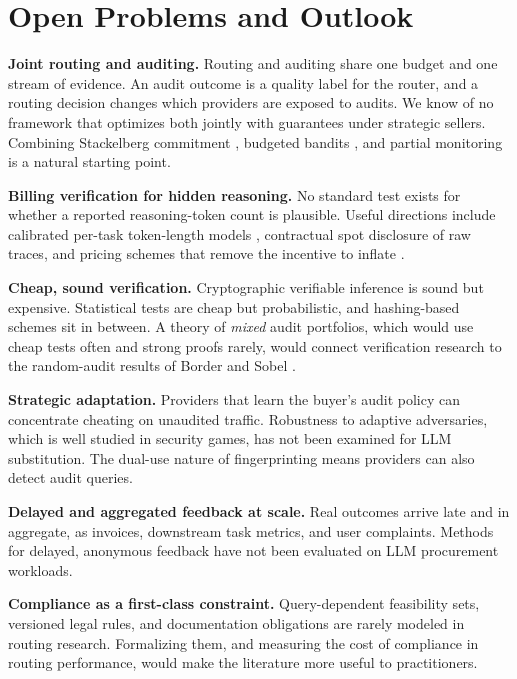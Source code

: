 \section{Open Problems and Outlook}\label{open-problems-and-outlook}

\textbf{Joint routing and auditing.} Routing and auditing share one budget and one stream of evidence. An audit outcome is a quality label for the router, and a routing decision changes which providers are exposed to audits. We know of no framework that optimizes both jointly with guarantees under strategic sellers. Combining Stackelberg commitment \cite{conitzer2006commit}, budgeted bandits \cite{badanidiyuru2018bwk}, and partial monitoring \cite{bartok2014partial} is a natural starting point.

\textbf{Billing verification for hidden reasoning.} No standard test exists for whether a reported reasoning-token count is plausible. Useful directions include calibrated per-task token-length models \cite{han2024tokenbudget}, contractual spot disclosure of raw traces, and pricing schemes that remove the incentive to inflate \cite{velasco2025overcharging}.

\textbf{Cheap, sound verification.} Cryptographic verifiable inference \cite{sun2024zkllm, chen2024zkml} is sound but expensive. Statistical tests \cite{gao2025equality} are cheap but probabilistic, and hashing-based schemes \cite{ong2025toploc} sit in between. A theory of \emph{mixed} audit portfolios, which would use cheap tests often and strong proofs rarely, would connect verification research to the random-audit results of Border and Sobel \cite{border1987samurai}.

\textbf{Strategic adaptation.} Providers that learn the buyer's audit policy can concentrate cheating on unaudited traffic. Robustness to adaptive adversaries, which is well studied in security games, has not been examined for LLM substitution. The dual-use nature of fingerprinting \cite{pasquini2025llmmap} means providers can also detect audit queries.

\textbf{Delayed and aggregated feedback at scale.} Real outcomes arrive late and in aggregate, as invoices, downstream task metrics, and user complaints. Methods for delayed, anonymous feedback \cite{pikeburke2018aggregated, vernade2017delayed} have not been evaluated on LLM procurement workloads.

\textbf{Compliance as a first-class constraint.} Query-dependent feasibility sets, versioned legal rules, and documentation obligations \cite{eu2024aiact, cac2024crossborder} are rarely modeled in routing research. Formalizing them, and measuring the cost of compliance in routing performance, would make the literature more useful to practitioners.


